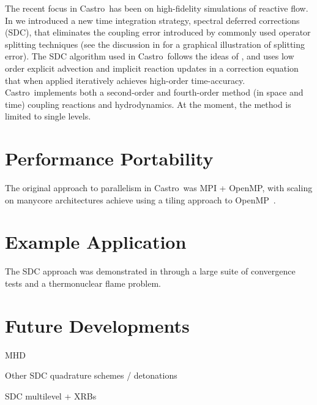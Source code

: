 \documentclass[a4paper]{jpconf}
\newcommand{\castro}{{\sffamily Castro}}
\begin{document}
The recent focus in \castro\ has been on high-fidelity simulations of
reactive flow.  In \cite{castro:sdc} we introduced a new time
integration strategy, spectral deferred corrections (SDC), that
eliminates the coupling error introduced by commonly used operator
splitting techniques (see the discussion in \cite{astronum:2018} for a
graphical illustration of splitting error).  The SDC algorithm used in
\castro\ follows the ideas of \cite{dutt:2000,minion:2003}, and uses
low order explicit advection and implicit reaction updates in a
correction equation that when applied iteratively achieves high-order
time-accuracy.  \castro\ implements both a second-order and
fourth-order method (in space and time) coupling reactions and
hydrodynamics.  At the moment, the method is limited to single levels.


\section{Performance Portability}

The original approach to parallelism in \castro\ was MPI + OpenMP,
with scaling on manycore architectures achieve using a tiling approach
to OpenMP~\cite{tiling}.  

\section{Example Application}

The SDC approach was demonstrated in \cite{castro:sdc} through a large
suite of convergence tests and a thermonuclear flame problem.  

\section{Future Developments}

MHD

Other SDC quadrature schemes / detonations

SDC multilevel + XRBs
\end{document}
